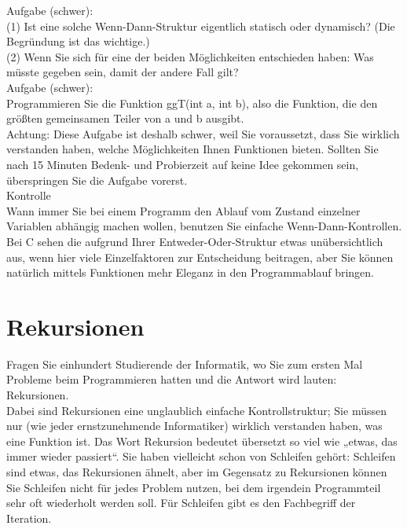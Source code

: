 Aufgabe (schwer): \\

(1)	Ist eine solche Wenn-Dann-Struktur eigentlich statisch oder dynamisch? (Die Begründung ist das wichtige.)\\

(2)	Wenn Sie sich für eine der beiden Möglichkeiten entschieden haben: Was müsste gegeben sein, damit der andere Fall gilt?\\

Aufgabe (schwer):\\

Programmieren Sie die Funktion ggT(int a, int b), also die Funktion, die den größten gemeinsamen Teiler von a und b ausgibt.\\

Achtung: Diese Aufgabe ist deshalb schwer, weil Sie voraussetzt, dass Sie wirklich verstanden haben, welche Möglichkeiten Ihnen Funktionen bieten. Sollten Sie nach 15 Minuten Bedenk- und Probierzeit auf keine Idee gekommen sein, überspringen Sie die Aufgabe vorerst.\\

Kontrolle\\

Wann immer Sie bei einem Programm den Ablauf vom Zustand einzelner Variablen abhängig machen wollen, benutzen Sie einfache Wenn-Dann-Kontrollen. Bei C sehen die aufgrund Ihrer Entweder-Oder-Struktur etwas unübersichtlich aus, wenn hier viele Einzelfaktoren zur Entscheidung beitragen, aber Sie können natürlich mittels Funktionen mehr Eleganz in den Programmablauf bringen.

\section{Rekursionen}

Fragen Sie einhundert Studierende der Informatik, wo Sie zum ersten Mal Probleme beim Programmieren hatten und die Antwort wird lauten: Rekursionen. \\

Dabei sind Rekursionen eine unglaublich einfache Kontrollstruktur; Sie müssen nur (wie jeder ernstzunehmende Informatiker) wirklich verstanden haben, was eine Funktion ist. Das Wort Rekursion bedeutet übersetzt so viel wie „etwas, das immer wieder passiert“. Sie haben vielleicht schon von Schleifen gehört: Schleifen sind etwas, das Rekursionen ähnelt, aber im Gegensatz zu Rekursionen können Sie Schleifen nicht für jedes Problem nutzen, bei dem irgendein Programmteil sehr oft wiederholt werden soll. Für Schleifen gibt es den Fachbegriff der Iteration.

